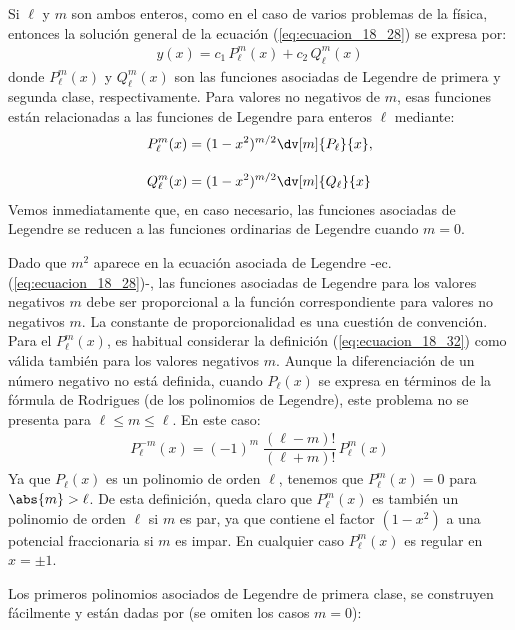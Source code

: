 Si $\ell$ y $m$ son ambos enteros, como en el caso de varios problemas de la física, entonces la solución general de la ecuación (\ref{eq:ecuacion_18_28}) se expresa por:
\begin{align}
y(x) = c_{1} \, P_{\ell}^{m} (x) + c_{2} \, Q_{\ell}^{m} (x)
\label{eq:ecuacion_18_31}
\end{align}
donde $P_{\ell}^{m} (x)$ y $Q_{\ell}^{m} (x)$ son las funciones asociadas de Legendre de primera y segunda clase, respectivamente. Para valores no negativos de $m$, esas funciones están relacionadas a las funciones de Legendre para enteros $\ell$ mediante:
\begin{align}
\begin{aligned}
P_{\ell}^{m} (x) &= (1 - x^{2})^{m/2} \dv[m]{P_{\ell}}{x}, \\[1em]
Q_{\ell}^{m} (x) &= (1 - x^{2})^{m/2} \dv[m]{Q_{\ell}}{x}
\end{aligned}
\label{eq:ecuacion_18_32}
\end{align}
Vemos inmediatamente que, en caso necesario, las funciones asociadas de Legendre se reducen a las funciones ordinarias de Legendre cuando $m = 0$. 
\par
Dado que $m^{2}$ aparece en la ecuación asociada de Legendre -ec. (\ref{eq:ecuacion_18_28})-, las funciones asociadas de Legendre para los valores negativos $m$ debe ser proporcional a la función correspondiente para valores no negativos $m$. La constante de proporcionalidad es una cuestión de convención. Para el $P_{\ell}^{m} (x) $, es habitual considerar la definición (\ref{eq:ecuacion_18_32}) como válida también para los valores negativos $m$. Aunque la diferenciación de un número negativo no está definida, cuando $P_{\ell}(x)$ se expresa en términos de la fórmula de Rodrigues (de los polinomios de Legendre), este problema no se presenta para $\ell \leq m \leq \ell$. En este caso:
\begin{align}
P_{\ell}^{-m} (x) = (-1)^{m} \; \dfrac{(\ell - m)!}{(\ell + m)!} \, P_{\ell}^{m} (x)
\label{eq:ecuacion_18_33}
\end{align}
Ya que $P_{\ell}(x)$ es un polinomio de orden $\ell$, tenemos que $P_{\ell}^{m}(x)=0$ para $\abs{m} > \ell$. De esta definición, queda claro que $P_{\ell}^{m} (x)$ es también un polinomio de orden $\ell$ si $m$ es par, ya que contiene el factor $(1-x^{2})$ a una potencial fraccionaria si $m$ es impar. En cualquier caso $P_{\ell}^{m}(x)$ es regular en $x = \pm 1$.
\par
Los primeros polinomios asociados de Legendre de primera clase, se construyen fácilmente y están dadas por (se omiten los casos $m=0$):
